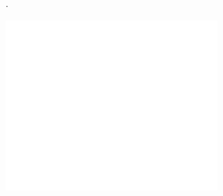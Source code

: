 
\pagecolor{black}
.
\vspace{4cm}
\begin{center}
  \includegraphics[width=0.6\textwidth]{../general/logo_white.pdf}
\end{center}

\vspace*{2cm}
\begin{center}
  {\color{white} \Huge\textbf{\textsf{\docTitle}}}
\end{center}

\vspace*{1cm}
\begin{center}
  {\color{white} \Huge\textbf{\textsf{\productName}}}
\end{center}

\begin{center}
  {\color{white} \Huge\textbf{\textsf{\docSubTitle}}}
\end{center}

\afterpage{\nopagecolor}
\newpage
